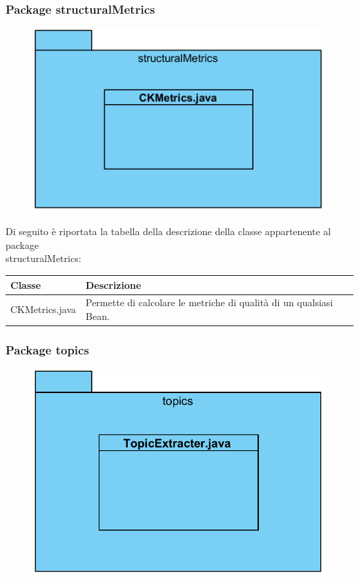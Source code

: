 \documentclass[11pt]{article}
\begin{document}
			\subsubsection{Package structuralMetrics}
			 \begin{figure}[!h]
				\centering
				\includegraphics{diagrams/MetricsPackageDiagram}
			\end{figure}
			\begin{description}
				\item Di seguito è riportata la tabella della descrizione della classe appartenente al package\\structuralMetrics:
				\item \begin{tabular}{|p{}|p{}|}
					\hline
					\textbf{Classe} & \textbf{Descrizione}\\
					\hline
					CKMetrics.java & Permette di calcolare le metriche di qualità di un qualsiasi Bean. \\
					\hline
				\end{tabular}
			\end{description}
		\newpage
			\subsubsection{Package topics}
			 \begin{figure}[!h]
				\centering
				\includegraphics{diagrams/TopicsPackageDiagram}
			\end{figure}
	
\end{document}
